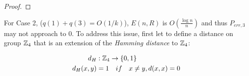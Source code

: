 \begin{proof}
%
%
%
% 
%
%
%
% 
\end{proof}
 

For Case 2, ($q(1)+q(3)=O(1/k)$), $E(n,R)$ is $O(\frac{\log n}{n})$ and thus $P_{err,3}$ may not approach to $0$. To address this issue, first let to define a distance on group $\mathbb{Z}_4$ that is an extension of the \textit{Hamming distance}  to $\mathbb{Z}_4$:

 \begin{align*}
d_H&: \mathbb{Z}_4\rightarrow \{ 0,1\}\\
d_H(x,y)&=1 \quad if \quad x \neq y, d(x,x)=0
\end{align*}


